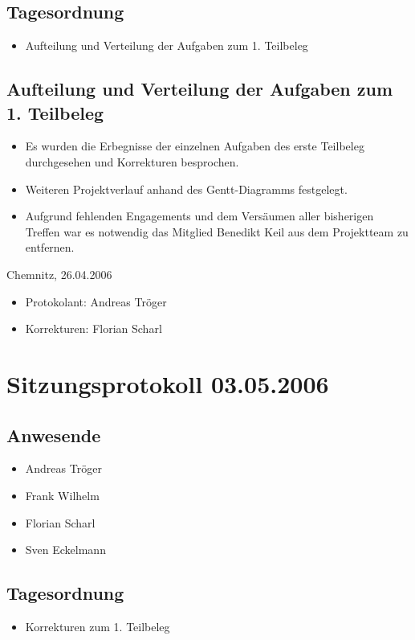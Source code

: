 		\subsection{Tagesordnung}
		\begin{itemize}
			\item Aufteilung und Verteilung der Aufgaben zum 1. Teilbeleg
		\end{itemize}
			\subsection{Aufteilung und Verteilung der Aufgaben zum 1. Teilbeleg}
			\begin{itemize}
				\item Es wurden die Erbegnisse der einzelnen Aufgaben des erste Teilbeleg durchgesehen und Korrekturen besprochen.
				\item Weiteren Projektverlauf anhand des Gentt-Diagramms festgelegt.
				\item Aufgrund fehlenden Engagements und dem Versäumen aller bisherigen Treffen war es notwendig das Mitglied Benedikt Keil aus dem Projektteam zu entfernen. 
			\end{itemize}
			Chemnitz, 26.04.2006
			\begin{itemize}
				\item Protokolant: Andreas Tröger
				\item Korrekturen: Florian Scharl
			\end{itemize}
\newpage
		\section{Sitzungsprotokoll 03.05.2006}
		\subsection{Anwesende}
		\begin{itemize}
			\item Andreas Tröger
			\item Frank Wilhelm
			\item Florian Scharl
			\item Sven Eckelmann
		\end{itemize}
		\subsection{Tagesordnung}
		\begin{itemize}
			\item Korrekturen zum 1. Teilbeleg
		\end{itemize}
